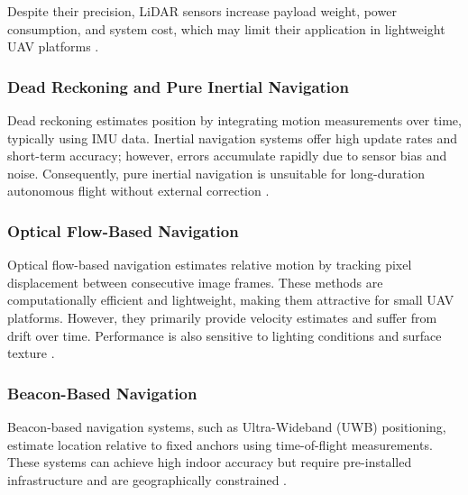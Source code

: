 Despite their precision, LiDAR sensors increase payload weight, power consumption, and system cost, which may limit their application in lightweight UAV platforms \cite{zhang2014loam, shan2018lego}.

\subsubsection{Dead Reckoning and Pure Inertial Navigation}

Dead reckoning estimates position by integrating motion measurements over time, typically using IMU data. Inertial navigation systems offer high update rates and short-term accuracy; however, errors accumulate rapidly due to sensor bias and noise. Consequently, pure inertial navigation is unsuitable for long-duration autonomous flight without external correction \cite{titterton2004strapdown}.

\subsubsection{Optical Flow-Based Navigation}

Optical flow-based navigation estimates relative motion by tracking pixel displacement between consecutive image frames. These methods are computationally efficient and lightweight, making them attractive for small UAV platforms. However, they primarily provide velocity estimates and suffer from drift over time. Performance is also sensitive to lighting conditions and surface texture \cite{scaramuzza2014vision}.

\subsubsection{Beacon-Based Navigation}

Beacon-based navigation systems, such as Ultra-Wideband (UWB) positioning, estimate location relative to fixed anchors using time-of-flight measurements. These systems can achieve high indoor accuracy but require pre-installed infrastructure and are geographically constrained \cite{ledergerber2015robot}.

